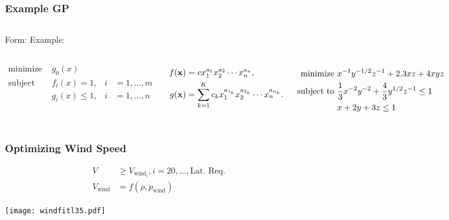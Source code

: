 \documentclass{beamer}
\begin{document}
\begin{frame}
    \frametitle{Example GP}

    \begin{columns}
        Form:
        Example:
    \end{columns}
    
    \begin{columns}
        \scriptsize
        \begin{align*}
            \text{minimize } &g_0(x) \\
            \text{subject to } &f_i(x) = 1, &i &= 1,\dots,m\\
                               &g_i(x) \leq 1, &i &= 1,\dots,n
        \end{align*}

        \begin{align*}
            f(\bold{x}) &= c x_1^{a_1} x_2^{a_2} \dotsm x_n^{a_n} , \\
            g(\bold{x}) &= \displaystyle\sum_{k=1}^K c_k x_1^{a_{1_k}} x_2^{a_{2_k}} \dotsm x_n^{a_{n_k}}.
        \end{align*}

        \scriptsize
        \begin{align*}
            \text{minimize } & x^{-1}y^{-1/2}z^{-1} + 2.3xz + 4xyz\\
            \text{subject to } &\frac{1}{3}x^{-2}y^{-2} + \frac{4}{3}y^{1/2}z^{-1} \leq 1\\
                              &x + 2y + 3z \leq 1
        \normalsize
        \end{align*}

    \end{columns}
\end{frame}

\begin{frame}
    \frametitle{Optimizing Wind Speed}

    \begin{align*}
        V &\geq V_{\text{wind}_i}, i = 20,\dots,\text{Lat. Req.} \\
        V_{\text{wind}} &= f(\rho, p_{\text{wind}})
    \end{align*}

    \begin{center}
    \texttt{[image: windfitl35.pdf]}
    \end{center}

\end{frame}
\end{document}
